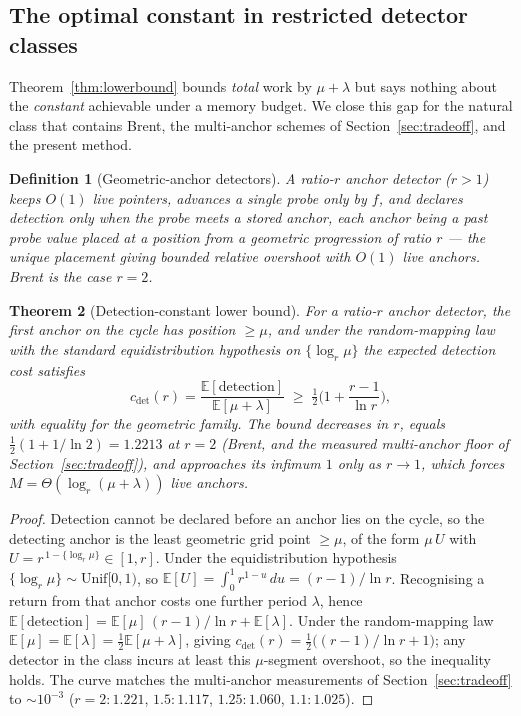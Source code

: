 \documentclass[11pt]{article}
\newtheorem{theorem}{Theorem}[section]
\newtheorem{definition}[theorem]{Definition}
\begin{document}
\subsection{The optimal constant in restricted detector classes}
\label{sec:restricted-lb}

Theorem~\ref{thm:lowerbound} bounds \emph{total} work by $\mu+\lambda$ but says
nothing about the \emph{constant} achievable under a memory budget. We close this
gap for the natural class that contains Brent, the multi-anchor schemes of
Section~\ref{sec:tradeoff}, and the present method.

\begin{definition}[Geometric-anchor detectors]
\label{def:geom-anchor}
A \emph{ratio-$r$ anchor detector} ($r>1$) keeps $O(1)$ live pointers, advances a
single probe only by $f$, and declares detection only when the probe meets a
stored \emph{anchor}, each anchor being a past probe value placed at a position
from a geometric progression of ratio $r$ --- the unique placement giving bounded
relative overshoot with $O(1)$ live anchors. Brent is the case $r=2$.
\end{definition}

\begin{theorem}[Detection-constant lower bound]
\label{thm:restricted-lb}
For a ratio-$r$ anchor detector, the first anchor on the cycle has position
$\ge\mu$, and under the random-mapping law with the standard equidistribution
hypothesis on $\{\log_r\mu\}$ the expected detection cost satisfies
\[
c_{\det}(r)=\frac{\mathbb E[\text{detection}]}{\mathbb E[\mu+\lambda]}
\;\ge\;\tfrac12\Big(1+\frac{r-1}{\ln r}\Big),
\]
with equality for the geometric family. The bound decreases in $r$, equals
$\tfrac12(1+1/\ln2)=1.2213$ at $r=2$ (Brent, and the measured multi-anchor floor
of Section~\ref{sec:tradeoff}), and approaches its infimum $1$ only as $r\to1$,
which forces $M=\Theta(\log_r(\mu+\lambda))$ live anchors.
\end{theorem}

\begin{proof}
Detection cannot be declared before an anchor lies on the cycle, so the detecting
anchor is the least geometric grid point $\ge\mu$, of the form $\mu\,U$ with
$U=r^{\,1-\{\log_r\mu\}}\in[1,r]$. Under the equidistribution hypothesis
$\{\log_r\mu\}\sim\mathrm{Unif}[0,1)$, so
$\mathbb E[U]=\int_0^1 r^{1-u}\,du=(r-1)/\ln r$. Recognising a return from that
anchor costs one further period $\lambda$, hence
$\mathbb E[\text{detection}]=\mathbb E[\mu]\,(r-1)/\ln r+\mathbb E[\lambda]$. Under
the random-mapping law $\mathbb E[\mu]=\mathbb E[\lambda]=\tfrac12\mathbb E[\mu+\lambda]$,
giving $c_{\det}(r)=\tfrac12\big((r-1)/\ln r+1\big)$; any detector in the class
incurs at least this $\mu$-segment overshoot, so the inequality holds. The curve
matches the multi-anchor measurements of Section~\ref{sec:tradeoff} to
$\sim10^{-3}$ ($r{=}2{:}1.221$, $1.5{:}1.117$, $1.25{:}1.060$, $1.1{:}1.025$).
\end{proof}
\end{document}
